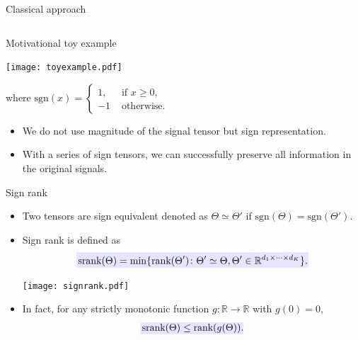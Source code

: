 \documentclass[10pt, mathserif]{beamer} %
\theoremstyle{definition}
\theoremstyle{plain}
\begin{document}
\begin{frame}{Classical approach}
\begin{itemize}
\begin{columns}
\begin{column}{0.5\textwidth}
\end{column}
\end{columns}
    
  
 \end{itemize}
\end{frame}

\begin{frame}{Motivational toy example}
    \begin{center}
    \texttt{[image: toyexample.pdf]}
    \end{center}
{\footnotesize where $\text{sgn}(x) = \begin{cases}1,&\text{ if } x\geq 0,\\-1 &\text{ otherwise.}\end{cases}$}
    \begin{itemize}
    \item We do not use magnitude of the signal tensor but {\color{red}sign representation}.
     \item With a series of sign tensors, we can successfully preserve all information in the original signals.
    \end{itemize}
\end{frame}



\begin{frame}{Sign rank}
\begin{itemize}
    \item  Two tensors are sign equivalent denoted as $\Theta \simeq \Theta'$ if $\text{sgn}(\Theta) = \text{sgn}(\Theta')$.

    \item Sign rank is defined as
    \begin{align}
    \rlap{\textcolor{blue!10}{\rule[-\dp\strutbox]{235pt}{\baselineskip}}}\,\text{srank}(\Theta) = \min\{\text{rank}(\Theta')\colon \Theta'\simeq \Theta, \Theta'\in\mathbb{R}^{d_1\times\cdots\times d_K}\}.
    \end{align}
 \begin{center}
    \texttt{[image: signrank.pdf]}
    \end{center}
\item In fact, for any strictly monotonic function $g\colon\mathbb{R}\rightarrow \mathbb{R}$ with $g(0) = 0$,
\[\rlap{\textcolor{blue!10}{\rule[-\dp\strutbox]{105pt}{\baselineskip}}}\,\text{srank}(\Theta)\leq \text{rank}(g(\Theta)).\]
\end{itemize}


\end{frame}
\end{document}
